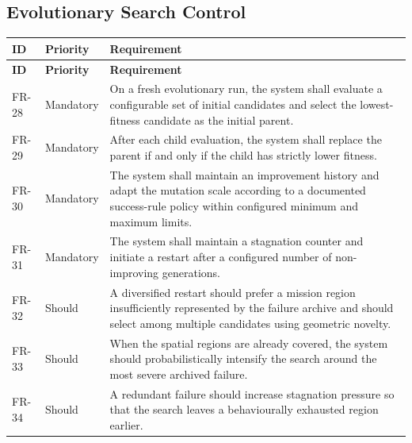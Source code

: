 \documentclass[11pt,a4paper]{report}
\begin{document}
\subsection{Evolutionary Search Control}
\begin{longtable}{L{1.7cm} L{2.1cm} L{10.8cm}}
\toprule
\textbf{ID} & \textbf{Priority} & \textbf{Requirement}\\
\midrule
\endfirsthead
\toprule
\textbf{ID} & \textbf{Priority} & \textbf{Requirement}\\
\midrule
\endhead
FR-28 & Mandatory & On a fresh evolutionary run, the system shall evaluate a configurable set of initial candidates and select the lowest-fitness candidate as the initial parent.\\
FR-29 & Mandatory & After each child evaluation, the system shall replace the parent if and only if the child has strictly lower fitness.\\
FR-30 & Mandatory & The system shall maintain an improvement history and adapt the mutation scale according to a documented success-rule policy within configured minimum and maximum limits.\\
FR-31 & Mandatory & The system shall maintain a stagnation counter and initiate a restart after a configured number of non-improving generations.\\
FR-32 & Should & A diversified restart should prefer a mission region insufficiently represented by the failure archive and should select among multiple candidates using geometric novelty.\\
FR-33 & Should & When the spatial regions are already covered, the system should probabilistically intensify the search around the most severe archived failure.\\
FR-34 & Should & A redundant failure should increase stagnation pressure so that the search leaves a behaviourally exhausted region earlier.\\
\bottomrule
\end{longtable}
\end{document}
